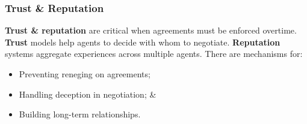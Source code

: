 \documentclass[a4paper,11pt]{article}
\begin{document}
\subsubsection{Trust \& Reputation}
\textbf{Trust \& reputation} are critical when agreements must be enforced overtime.
\textbf{Trust} models help agents to decide with whom to negotiate.
\textbf{Reputation} systems aggregate experiences across multiple agents.
There are mechanisms for:
\begin{itemize}
    \item   Preventing reneging on agreements;
    \item   Handling deception in negotiation; \&
    \item   Building long-term relationships.
\end{itemize}
\end{document}
